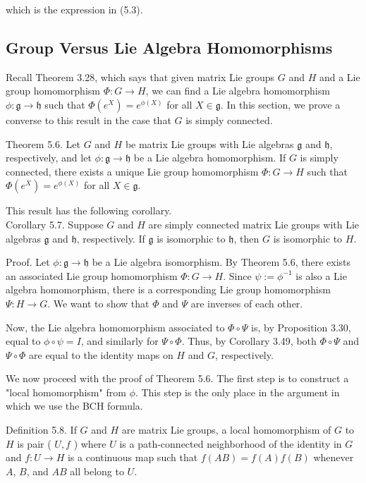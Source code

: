 \documentclass[10pt, letterpaper]{article}
\begin{document}
which is the expression in (5.3).

\subsection*{Group Versus Lie Algebra Homomorphisms}
Recall Theorem 3.28, which says that given matrix Lie groups $G$ and $H$ and a Lie group homomorphism $\Phi: G \rightarrow H$, we can find a Lie algebra homomorphism $\phi: \mathfrak{g} \rightarrow \mathfrak{h}$ such that $\Phi\left(e^{X}\right)=e^{\phi(X)}$ for all $X \in \mathfrak{g}$. In this section, we prove a converse to this result in the case that $G$ is simply connected.

Theorem 5.6. Let $G$ and $H$ be matrix Lie groups with Lie algebras $\mathfrak{g}$ and $\mathfrak{h}$, respectively, and let $\phi: \mathfrak{g} \rightarrow \mathfrak{h}$ be a Lie algebra homomorphism. If $G$ is simply connected, there exists a unique Lie group homomorphism $\Phi: G \rightarrow H$ such that $\Phi\left(e^{X}\right)=e^{\phi(X)}$ for all $X \in \mathfrak{g}$.

This result has the following corollary.\\
Corollary 5.7. Suppose $G$ and $H$ are simply connected matrix Lie groups with Lie algebras $\mathfrak{g}$ and $\mathfrak{h}$, respectively. If $\mathfrak{g}$ is isomorphic to $\mathfrak{h}$, then $G$ is isomorphic to $H$.

Proof. Let $\phi: \mathfrak{g} \rightarrow \mathfrak{h}$ be a Lie algebra isomorphism. By Theorem 5.6, there exists an associated Lie group homomorphism $\Phi: G \rightarrow H$. Since $\psi:=\phi^{-1}$ is also a Lie algebra homomorphism, there is a corresponding Lie group homomorphism $\Psi: H \rightarrow G$. We want to show that $\Phi$ and $\Psi$ are inverses of each other.

Now, the Lie algebra homomorphism associated to $\Phi \circ \Psi$ is, by Proposition 3.30, equal to $\phi \circ \psi=I$, and similarly for $\Psi \circ \Phi$. Thus, by Corollary 3.49, both $\Phi \circ \Psi$ and $\Psi \circ \Phi$ are equal to the identity maps on $H$ and $G$, respectively.

We now proceed with the proof of Theorem 5.6. The first step is to construct a "local homomorphism" from $\phi$. This step is the only place in the argument in which we use the BCH formula.

Definition 5.8. If $G$ and $H$ are matrix Lie groups, a local homomorphism of $G$ to $H$ is pair ( $U, f$ ) where $U$ is a path-connected neighborhood of the identity in $G$ and $f: U \rightarrow H$ is a continuous map such that $f(A B)=f(A) f(B)$ whenever $A$, $B$, and $A B$ all belong to $U$.
\end{document}
